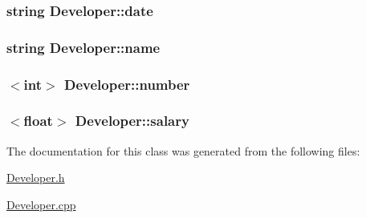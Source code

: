 \subsubsection[{date}]{\setlength{\rightskip}{0pt plus 5cm}string Developer\+::date\hspace{0.3cm}{\ttfamily [protected]}}\label{class_developer_ad157908ba8bd6ac6b16c8e28502953be}
\hypertarget{class_developer_a0398c537a81a118c0cebd64e453554a8}{}
\subsubsection[{name}]{\setlength{\rightskip}{0pt plus 5cm}string Developer\+::name\hspace{0.3cm}{\ttfamily [protected]}}\label{class_developer_a0398c537a81a118c0cebd64e453554a8}
\hypertarget{class_developer_af8a79869e44207cd6d3ef176cff2f2d1}{}
\subsubsection[{number}]{$<$int$>$ Developer\+::number\hspace{0.3cm}{\ttfamily [protected]}}\label{class_developer_af8a79869e44207cd6d3ef176cff2f2d1}
\hypertarget{class_developer_adcd646e88c19d2570f285715076db8bb}{}
\subsubsection[{salary}]{$<$float$>$ Developer\+::salary\hspace{0.3cm}{\ttfamily [protected]}}\label{class_developer_adcd646e88c19d2570f285715076db8bb}


The documentation for this class was generated from the following files\+:\begin{DoxyCompactItemize}
\item 
\hyperlink{_developer_8h}{Developer.\+h}\item 
\hyperlink{_developer_8cpp}{Developer.\+cpp}\end{DoxyCompactItemize}
